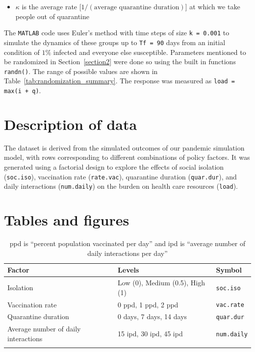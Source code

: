 \documentclass[12pt,a4paper]{article}
\begin{document}
\begin{appendices}
\begin{itemize}
	\vspace*{-3mm}
	\item $\kappa$ is the average rate [$1/(\text{average quarantine duration})$] at which we take people out of quarantine
\end{itemize}
The \verb`MATLAB` code uses Euler's method with time steps of size \verb`k = 0.001` to simulate the dynamics of these groups up to \verb`Tf = 90` days from an initial condition of $1\%$ infected and everyone else susceptible. Parameters mentioned to be randomized in Section~\ref{section2} were done so using the built in functions \verb`randn()`. The range of possible values are shown in Table~\ref{tab:randomization_summary}. The response was measured as \verb`load = max(i + q)`.

\section{Description of data}\label{appendixB}
The dataset is derived from the simulated outcomes of our pandemic simulation model, with rows corresponding to different combinations of policy factors. It was generated using a factorial design to explore the effects of social isolation (\verb'soc.iso'), vaccination rate (\verb'rate.vac'), quarantine duration (\verb'quar.dur'), and daily interactions (\verb'num.daily') on the burden on health care resources (\verb'load').

\section{Tables and figures}\label{appendixC}

\begin{table}[H]
    \centering
    \begin{tabular}{l l l}\hline
         Factor &  Levels & Symbol \\ \hline\hline
         Isolation & Low (0), Medium (0.5), High (1) & \verb`soc.iso` \\ \hline
         Vaccination rate & 0 \si{ppd}, 1 \si{ppd}, 2 \si{ppd} & \verb`vac.rate` \\ \hline
         Quarantine duration & 0 days, 7 days, 14 days & \verb`quar.dur`\\ \hline
         Average number of daily interactions & 15 \si{ipd}, 30 \si{ipd}, 45 \si{ipd} & \verb`num.daily` \\ \hline \\
    \end{tabular}
    \caption{\si{ppd} is ``percent population vaccinated per day'' and \si{ipd} is ``average number of daily interactions per day''}
    \label{tab:factor_summary}
\end{table}


\end{appendices}
\end{document}
